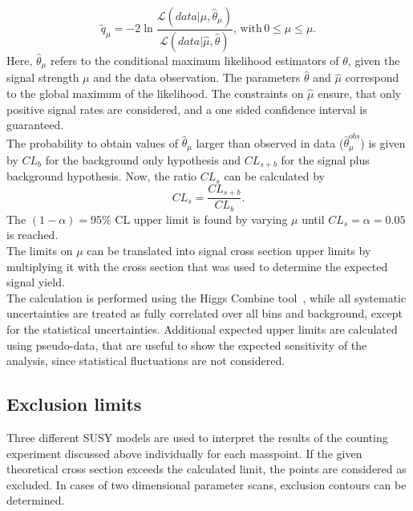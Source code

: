 \begin{equation}
 \tilde{q}_{\mu}= -2 \ln \frac{\mathcal{L}(data|\mu,\hat{\theta}_{\mu})}{\mathcal{L}(data|\hat{\mu},\hat{\theta})}, \,\mathrm{with}\,0\leq\hat{\mu}\leq\mu.
\end{equation}
Here, $\hat{\theta}_{\mu}$ refers to the conditional maximum likelihood estimators of $\theta$, given the signal strength $\mu$ and the data observation. The parameters $\hat{\theta}$ and $\hat{\mu}$ correspond to the global maximum of the likelihood. The constraints on $\hat{\mu}$ ensure, that only positive signal rates are considered, and a one sided confidence interval is guaranteed.\\
The probability to obtain values of $\hat{\theta}_{\mu}$ larger than observed in data ($\hat{\theta}_{\mu}^{obs}$) is given by $CL_b$ for the background only hypothesis and $CL_{s+b}$ for the signal plus background hypothesis. Now, the ratio $CL_s$ can be calculated by
\begin{equation}
 CL_s=\frac{CL_{s+b}}{CL_b}.
\end{equation}
The $(1-\alpha)=95\%$ CL upper limit is found by varying $\mu$ until $CL_s = \alpha=0.05$ is reached.\\
The limits on $\mu$ can be translated into signal cross section upper limits by multiplying it with the cross section that was used to determine the expected signal yield.\\
The calculation is performed using the Higgs Combine tool~\cite{CLS3}, while all systematic uncertainties are treated as fully correlated over all bins and background, except for the statistical uncertainties.
Additional expected upper limits are calculated using pseudo-data, that are useful to show the expected sensitivity of the analysis, since statistical fluctuations are not considered.


\subsection{Exclusion limits}
Three different SUSY models are used to interpret the results of the counting experiment discussed above individually for each masspoint. If the given theoretical cross section exceeds the calculated limit, the points are considered as excluded. In cases of two dimensional parameter scans, exclusion contours can be determined.


